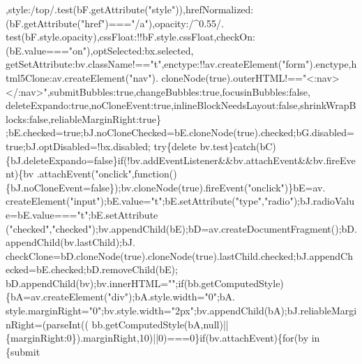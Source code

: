 \begin{DoxyCode}
      ,style:/top/.test(bF.getAttribute(\textcolor{stringliteral}{"style"})),hrefNormalized:(bF.getAttribute(\textcolor{stringliteral}{"href"})===\textcolor{stringliteral}{"/a"}),opacity:/^0.55/.
      test(bF.style.opacity),cssFloat:!!bF.style.cssFloat,checkOn:(bE.value===\textcolor{stringliteral}{"on"}),optSelected:bx.selected,
      getSetAttribute:bv.className!==\textcolor{stringliteral}{"t"},enctype:!!av.createElement(\textcolor{stringliteral}{"form"}).enctype,html5Clone:av.createElement(\textcolor{stringliteral}{"nav"}).
      cloneNode(\textcolor{keyword}{true}).outerHTML!==\textcolor{stringliteral}{"<:nav></:nav>"},submitBubbles:\textcolor{keyword}{true},changeBubbles:\textcolor{keyword}{true},focusinBubbles:\textcolor{keyword}{false},
      deleteExpando:\textcolor{keyword}{true},noCloneEvent:\textcolor{keyword}{true},inlineBlockNeedsLayout:\textcolor{keyword}{false},shrinkWrapBlocks:\textcolor{keyword}{false},reliableMarginRight:\textcolor{keyword}{true}\}
      ;bE.checked=\textcolor{keyword}{true};bJ.noCloneChecked=bE.cloneNode(\textcolor{keyword}{true}).checked;bG.disabled=\textcolor{keyword}{true};bJ.optDisabled=!bx.disabled;\textcolor{keywordflow}{
      try}\{\textcolor{keyword}{delete} bv.test\}\textcolor{keywordflow}{catch}(bC)\{bJ.deleteExpando=\textcolor{keyword}{false}\}\textcolor{keywordflow}{if}(!bv.addEventListener&&bv.attachEvent&&bv.fireEvent)\{bv
      .attachEvent(\textcolor{stringliteral}{"onclick"},\textcolor{keyword}{function}()\{bJ.noCloneEvent=\textcolor{keyword}{false}\});bv.cloneNode(\textcolor{keyword}{true}).fireEvent(\textcolor{stringliteral}{"onclick"})\}bE=av.
      createElement(\textcolor{stringliteral}{"input"});bE.value=\textcolor{stringliteral}{"t"};bE.setAttribute(\textcolor{stringliteral}{"type"},\textcolor{stringliteral}{"radio"});bJ.radioValue=bE.value===\textcolor{stringliteral}{"t"};bE.setAttribute
      (\textcolor{stringliteral}{"checked"},\textcolor{stringliteral}{"checked"});bv.appendChild(bE);bD=av.createDocumentFragment();bD.appendChild(bv.lastChild);bJ.
      checkClone=bD.cloneNode(\textcolor{keyword}{true}).cloneNode(\textcolor{keyword}{true}).lastChild.checked;bJ.appendChecked=bE.checked;bD.removeChild(bE);
      bD.appendChild(bv);bv.innerHTML=\textcolor{stringliteral}{""};\textcolor{keywordflow}{if}(bb.getComputedStyle)\{bA=av.createElement(\textcolor{stringliteral}{"div"});bA.style.width=\textcolor{stringliteral}{"0"};bA.
      style.marginRight=\textcolor{stringliteral}{"0"};bv.style.width=\textcolor{stringliteral}{"2px"};bv.appendChild(bA);bJ.reliableMarginRight=(parseInt((
      bb.getComputedStyle(bA,null)||\{marginRight:0\}).marginRight,10)||0)===0\}\textcolor{keywordflow}{if}(bv.attachEvent)\{\textcolor{keywordflow}{for}(by in \{submit

\end{DoxyCode}
